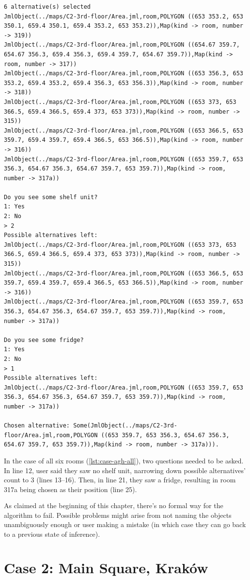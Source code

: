 \begin{lstlisting}[label={lst:case-agh-all},caption={Mediation between all rooms 315--319.}]
6 alternative(s) selected
JmlObject(../maps/C2-3rd-floor/Area.jml,room,POLYGON ((653 353.2, 653 350.1, 659.4 350.1, 659.4 353.2, 653 353.2)),Map(kind -> room, number -> 319))
JmlObject(../maps/C2-3rd-floor/Area.jml,room,POLYGON ((654.67 359.7, 654.67 356.3, 659.4 356.3, 659.4 359.7, 654.67 359.7)),Map(kind -> room, number -> 317))
JmlObject(../maps/C2-3rd-floor/Area.jml,room,POLYGON ((653 356.3, 653 353.2, 659.4 353.2, 659.4 356.3, 653 356.3)),Map(kind -> room, number -> 318))
JmlObject(../maps/C2-3rd-floor/Area.jml,room,POLYGON ((653 373, 653 366.5, 659.4 366.5, 659.4 373, 653 373)),Map(kind -> room, number -> 315))
JmlObject(../maps/C2-3rd-floor/Area.jml,room,POLYGON ((653 366.5, 653 359.7, 659.4 359.7, 659.4 366.5, 653 366.5)),Map(kind -> room, number -> 316))
JmlObject(../maps/C2-3rd-floor/Area.jml,room,POLYGON ((653 359.7, 653 356.3, 654.67 356.3, 654.67 359.7, 653 359.7)),Map(kind -> room, number -> 317a))

Do you see some shelf unit?
1: Yes
2: No
> 2
Possible alternatives left:
JmlObject(../maps/C2-3rd-floor/Area.jml,room,POLYGON ((653 373, 653 366.5, 659.4 366.5, 659.4 373, 653 373)),Map(kind -> room, number -> 315))
JmlObject(../maps/C2-3rd-floor/Area.jml,room,POLYGON ((653 366.5, 653 359.7, 659.4 359.7, 659.4 366.5, 653 366.5)),Map(kind -> room, number -> 316))
JmlObject(../maps/C2-3rd-floor/Area.jml,room,POLYGON ((653 359.7, 653 356.3, 654.67 356.3, 654.67 359.7, 653 359.7)),Map(kind -> room, number -> 317a))

Do you see some fridge?
1: Yes
2: No
> 1
Possible alternatives left:
JmlObject(../maps/C2-3rd-floor/Area.jml,room,POLYGON ((653 359.7, 653 356.3, 654.67 356.3, 654.67 359.7, 653 359.7)),Map(kind -> room, number -> 317a))

Chosen alternative: Some(JmlObject(../maps/C2-3rd-floor/Area.jml,room,POLYGON ((653 359.7, 653 356.3, 654.67 356.3, 654.67 359.7, 653 359.7)),Map(kind -> room, number -> 317a))).
\end{lstlisting}

In the case of all six rooms (\cref{lst:case-agh-all}), two questions needed to be asked. In line 12, user said they saw no shelf unit, narrowing down possible alternatives' count to 3 (lines 13--16). Then, in line 21, they saw a fridge, resulting in room 317a being chosen as their position (line 25).

As claimed at the beginning of this chapter, there's no formal way for the algorithm to fail. Possible problems might arise from not naming the objects unambiguously enough or user making a mistake (in which case they can go back to a previous state of inference).

\section{Case 2: Main Square, Kraków}
\label{sec:case-cracow-square}




